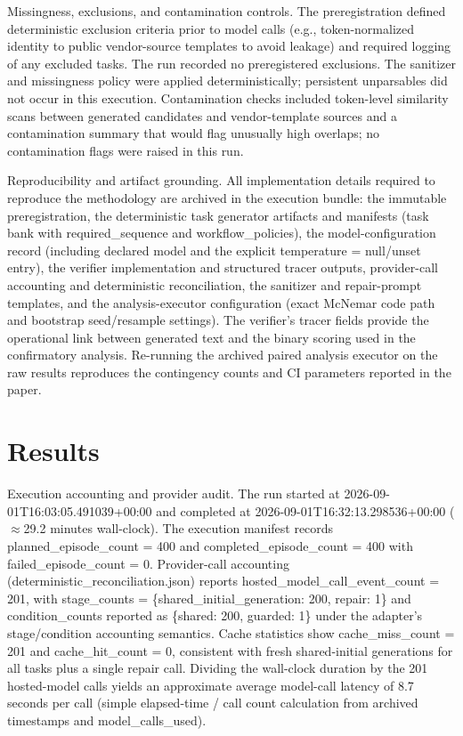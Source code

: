 \documentclass[conference]{IEEEtran}
\begin{document}
Missingness, exclusions, and contamination controls. The preregistration defined deterministic exclusion criteria prior to model calls (e.g., token-normalized identity to public vendor-source templates to avoid leakage) and required logging of any excluded tasks. The run recorded no preregistered exclusions. The sanitizer and missingness policy were applied deterministically; persistent unparsables did not occur in this execution. Contamination checks included token-level similarity scans between generated candidates and vendor-template sources and a contamination summary that would flag unusually high overlaps; no contamination flags were raised in this run.

Reproducibility and artifact grounding. All implementation details required to reproduce the methodology are archived in the execution bundle: the immutable preregistration, the deterministic task generator artifacts and manifests (task bank with required\_sequence and workflow\_policies), the model-configuration record (including declared model and the explicit temperature = null/unset entry), the verifier implementation and structured tracer outputs, provider-call accounting and deterministic reconciliation, the sanitizer and repair-prompt templates, and the analysis-executor configuration (exact McNemar code path and bootstrap seed/resample settings). The verifier's tracer fields provide the operational link between generated text and the binary scoring used in the confirmatory analysis. Re-running the archived paired analysis executor on the raw results reproduces the contingency counts and CI parameters reported in the paper.

\section{Results}
Execution accounting and provider audit. The run started at 2026-09-01T16:03:05.491039+00:00 and completed at 2026-09-01T16:32:13.298536+00:00 (\ensuremath{\approx}29.2 minutes wall-clock). The execution manifest records planned\_episode\_count = 400 and completed\_episode\_count = 400 with failed\_episode\_count = 0. Provider-call accounting (deterministic\_reconciliation.json) reports hosted\_model\_call\_event\_count = 201, with stage\_counts = \{shared\_initial\_generation: 200, repair: 1\} and condition\_counts reported as \{shared: 200, guarded: 1\} under the adapter's stage/condition accounting semantics. Cache statistics show cache\_miss\_count = 201 and cache\_hit\_count = 0, consistent with fresh shared-initial generations for all tasks plus a single repair call. Dividing the wall-clock duration by the 201 hosted-model calls yields an approximate average model-call latency of 8.7 seconds per call (simple elapsed-time / call count calculation from archived timestamps and model\_calls\_used).
\end{document}
